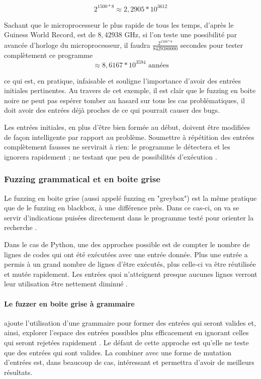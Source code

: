 \documentclass[a4paper]{report}
\begin{document}
$$2^{1500 * 8} \approx 2,2905 * 10^{3612}$$

Sachant que le microprocesseur le plus rapide de tous les temps, d'après le Guiness World Record, est de $8,42938$ GHz\cite{gwrcpu}, si l'on teste une possibilité par avancée d'horloge du microprocesseur, il faudra $\frac{2^{1500*8}}{ 8429380000}$ secondes pour tester complètement ce programme
$$\approx 8,6167 * 10^{3594} \text{ années}$$

ce qui est, en pratique, infaisable et souligne l'importance d'avoir des entrées initiales pertinentes.
Au travers de cet exemple, il est clair que le fuzzing en boite noire ne peut pas espérer tomber au hasard sur tous les cas problématiques, il doit avoir des entrées déjà proches de ce qui pourrait causer des bugs.


Les entrées initiales, en plus d'être bien formée au début, doivent être modifiées de façon intelligente par rapport au problème.
Soumettre à répétition des entrées complètement fausses ne servirait à rien: le programme le détectera et les ignorera rapidement ; ne testant que peu de possibilités d'exécution \cite{Godefroid2020}.

\subsubsection{Fuzzing grammatical et en boite grise}

Le fuzzing en boite grise (aussi appelé fuzzing en "greybox") est la même pratique que de le fuzzing en blackbox, à une différence près.
Dans ce cas-ci, on va se servir d’indications puisées directement dans le programme testé pour orienter la recherche \cite{fuzzingbook2022:GreyboxFuzzer}.

Dans le cas de Python, une des approches possible est de compter le nombre de lignes de codes qui ont été exécutées avec une entrée donnée.
Plus une entrée a permis à un grand nombre de lignes d’être exécutés, plus celle-ci va être réutilisée et mutée rapidement.
Les entrées quoi n'atteignent presque aucunes lignes verront leur utilisation être nettement diminué \cite{fuzzingbook2022:GreyboxFuzzer}.

\paragraph{Le fuzzer en boite grise à grammaire} ajoute l'utilisation d'une grammaire pour former des entrées qui seront valides et, ainsi, explorer l'espace des entrées possibles plus efficacement en ignorant celles qui seront rejetées rapidement \cite{fuzzingbook2022:GreyboxGrammarFuzzer}.
Le défaut de cette approche est qu'elle ne teste que des entrées qui sont valides.
La combiner avec une forme de mutation d'entrées est, dans beaucoup de cas, intéressant et permettra d'avoir de meilleurs résultats.
\end{document}
